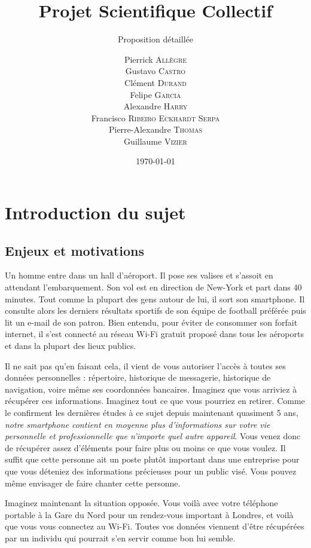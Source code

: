 \documentclass[a4paper, 12pt,twoside]{article}
\title{Projet Scientifique Collectif}
\author{Pierrick \textsc{Allègre} \\
		Gustavo \textsc{Castro} \\
		Clément \textsc{Durand} \\
		Felipe \textsc{Garcia} \\
		Alexandre \textsc{Harry} \\
		Francisco \textsc{Ribeiro Eckhardt Serpa} \\
		Pierre-Alexandre \textsc{Thomas} \\
		Guillaume \textsc{Vizier} \\}
\subtitle{Proposition détaillée}
\date{\today}
\begin{document}
\maketitle
\renewcommand{\baselinestretch}{1.1}
\setlength{\parskip}{0.5em}
\tableofcontents\clearpage



\section{Introduction du sujet}
	
	\subsection{Enjeux et motivations}
	
	Un homme entre dans un hall d'aéroport. Il pose ses valises et s'assoit en attendant l'embarquement. Son vol est en direction de New-York et part dans 40 minutes. Tout comme la plupart des gens autour de lui, il sort son smartphone.  Il consulte alors les derniers résultats sportifs de son équipe de football préférée puis lit un e-mail de son patron. Bien entendu, pour éviter de consommer son forfait internet, il s'est connecté au réseau \newcommand{\wifi}{Wi-Fi} \wifi{} gratuit proposé dans tous les aéroports et dans la plupart des lieux publics.
		
	Il ne sait pas qu'en faisant cela, il vient de vous autoriser l'accès à toutes ses données personnelles : répertoire, historique de messagerie, historique de navigation, voire même ses coordonnées bancaires. Imaginez que vous arriviez à récupérer ces informations. Imaginez tout ce que vous pourriez en retirer. Comme le confirment les dernières études à ce sujet depuis maintenant quasiment 5 ans, \emph{notre smartphone contient en moyenne plus d'informations sur votre vie personnelle et professionnelle que n'importe quel autre appareil}. Vous venez donc de récupérer assez d'éléments pour faire plus ou moins ce que vous voulez. Il suffit que cette personne ait un poste plutôt important dans une entreprise pour que vous déteniez des informations précieuses pour un public visé. Vous pouvez même envisager de faire chanter cette personne.
		
	Imaginez maintenant la situation opposée. Vous voilà avec votre téléphone portable à la Gare du Nord pour un rendez-vous important à Londres, et voilà que vous vous connectez au \wifi{}. Toutes vos données viennent d'être récupérées par un individu qui pourrait s'en servir comme bon lui semble. 
		
\end{document}
